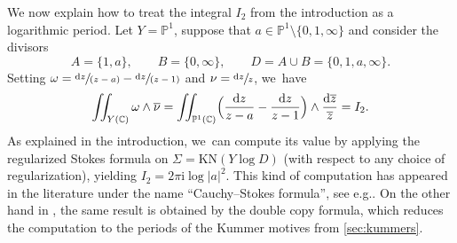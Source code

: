 \documentclass[10pt]{amsart}
\newcommand{\rBrac}[1]{\Bigl(#1\Bigr)}
\newcommand{\dslog}[1]{\sfrac{\dd#1}{#1}}
\newcommand{\spfrac}[2]{\sfrac{#1}{(#2)}}
\theoremstyle{definition}
\theoremstyle{remark}
\newenvironment{example}
  {\pushQED{\qed}\renewcommand{\qedsymbol}{$\lozenge$}\examplex}
  {\popQED\endexamplex}
\newcommand{\CC}{\mathbb{C}}
\newcommand{\PP}{\mathbb{P}}
\newcommand{\iu}{\mathrm{i}}
\newcommand{\ipi}{\pi\iu }
\newcommand{\tipi}{2\ipi}
\newcommand{\zb}{\overline{z}}
\newcommand{\dd}{\mathrm{d}}
\newcommand{\dlog}[1]{\frac{\dd#1}{#1}}
\newcommand{\Sig}{\Sigma}
\newcommand{\KN}[1]{\mathrm{KN}(#1)}
\providecommand{\eg}{e.g.}\providecommand{\ie}{i.e.}
\begin{document}
\begin{example}We now explain how to treat the integral $I_2$ from the introduction as a logarithmic period.
Let $Y = \PP^1$, suppose that $a \in \PP^1 \setminus \{0,1,\infty\}$ and consider the divisors\vspace*{-3pt}
\[
A = \{1,a\}, \qquad B = \{0,\infty\}, \qquad D = A \cup B = \{0,1,a,\infty\}.
\]
Setting $\omega = \spfrac{\dd z}{z-a} - \spfrac{\dd z}{z-1}$ and $\nu = \dslog{z}$, we~have\vspace*{-3pt}
\[
\iint_{Y(\CC)} \omega \wedge \overline{\nu} = \iint_{\PP^1(\CC)}\rBrac{\frac{\dd z}{z-a} - \frac{\dd z}{z-1}} \wedge \dlog{\zb} = I_2.
\]
As explained in the introduction, we~can compute its value by applying the regularized Stokes formula on $\Sig = \KN{Y\log D}$ (with respect to any choice of regularization), yielding $I_2 = \tipi \log|a|^2$. This kind of computation has appeared in the literature under the name ``Cauchy--Stokes formula'', see \eg \cite{KhesinRosly}. On the other hand in \cite[Ex.\,1.6]{BrownDupont}, the same result is obtained by the double copy formula, which reduces the computation to the periods of the Kummer motives from \autoref{sec:kummers}.
\end{example}
\end{document}
